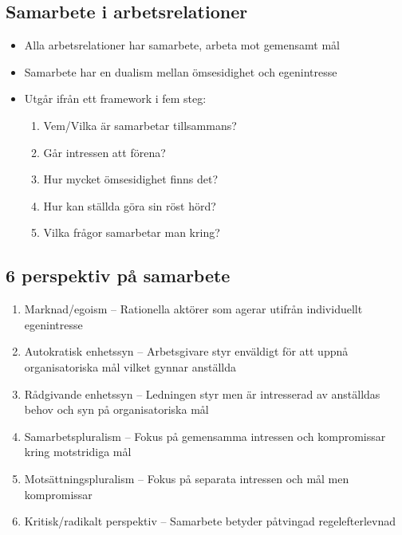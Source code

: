 \documentclass[12pt]{article}
\begin{document}
\subsection{Samarbete i arbetsrelationer}
\begin{itemize}
    \item Alla arbetsrelationer har samarbete, arbeta mot gemensamt mål
    \item Samarbete har en dualism mellan ömsesidighet och egenintresse
    \item Utgår ifrån ett framework i fem steg:
    \begin{enumerate}
        \item Vem/Vilka är samarbetar tillsammans?
        \item Går intressen att förena?
        \item Hur mycket ömsesidighet finns det?
        \item Hur kan ställda göra sin röst hörd?
        \item Vilka frågor samarbetar man kring?
    \end{enumerate}
\end{itemize}

\subsection{6 perspektiv på samarbete}
\begin{enumerate}
    \item Marknad/egoism -- Rationella aktörer som agerar utifrån individuellt egenintresse
    \item Autokratisk enhetssyn -- Arbetsgivare styr enväldigt för att uppnå organisatoriska mål vilket gynnar anställda
    \item Rådgivande enhetssyn -- Ledningen styr men är intresserad av anställdas behov och syn på organisatoriska mål
    \item Samarbetspluralism -- Fokus på gemensamma intressen och kompromissar kring motstridiga mål
    \item Motsättningspluralism -- Fokus på separata intressen och mål men kompromissar
    \item Kritisk/radikalt perspektiv -- Samarbete betyder påtvingad regelefterlevnad
\end{enumerate}
\end{document}
